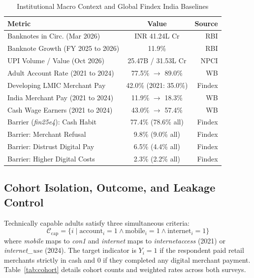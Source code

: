 \documentclass[conference]{IEEEtran}
\begin{document}
\begin{table}[t]
\caption{Institutional Macro Context and Global Findex India Baselines}
\centering
\footnotesize
\setlength{\tabcolsep}{3.5pt}
\begin{tabularx}{\columnwidth}{@{} >{\raggedright\arraybackslash}X c r @{}}
\toprule
\textbf{Metric} & \textbf{Value} & \textbf{Source} \\
\midrule
Banknotes in Circ. (Mar 2026) & INR 41.24L Cr & RBI \cite{rbi2026} \\
Banknote Growth (FY 2025 to 2026) & 11.9\% & RBI \cite{rbi2026} \\
UPI Volume / Value (Oct 2026) & 25.47B / 31.53L Cr & NPCI \cite{npci2026} \\
Adult Account Rate (2021 to 2024) & 77.5\% $\rightarrow$ 89.0\% & WB \cite{demirguc2022, worldbank2025} \\
Developing LMIC Merchant Pay & 42.0\% (2021: 35.0\%) & Findex \cite{worldbank2025} \\
India Merchant Pay (2021 to 2024) & 11.9\% $\rightarrow$ 18.3\% & WB \cite{demirguc2022, worldbank2025} \\
Cash Wage Earners (2021 to 2024) & 43.0\% $\rightarrow$ 57.4\% & WB \cite{demirguc2022, worldbank2025} \\
Barrier (\textit{fin25e4}): Cash Habit & 77.4\% (78.6\% all) & Findex \cite{worldbank2025} \\
Barrier: Merchant Refusal & 9.8\% (9.0\% all) & Findex \cite{worldbank2025} \\
Barrier: Distrust Digital Pay & 6.5\% (4.4\% all) & Findex \cite{worldbank2025} \\
Barrier: Higher Digital Costs & 2.3\% (2.2\% all) & Findex \cite{worldbank2025} \\
\bottomrule
\end{tabularx}
\label{tab:findex_baseline}
\end{table}

\subsection{Cohort Isolation, Outcome, and Leakage Control}
Technically capable adults satisfy three simultaneous criteria:
\begin{equation}
\mathcal{C}_{\text{cap}} = \{ i \mid \text{account}_i = 1 \land \text{mobile}_i = 1 \land \text{internet}_i = 1 \}
\end{equation}
where \textit{mobile} maps to \textit{con1} and \textit{internet} maps to \textit{internetaccess} (2021) or \textit{internet\_use} (2024). The target indicator is $Y_i = 1$ if the respondent paid retail merchants strictly in cash and $0$ if they completed any digital merchant payment. Table~\ref{tab:cohort} details cohort counts and weighted rates across both surveys.
\end{document}
